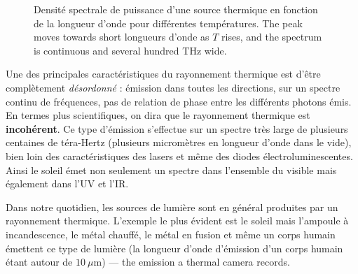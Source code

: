\begin{figure}[h!]
  \caption*{\footnotesize Densité spectrale de puissance d'une source thermique
  en fonction de la longueur d'onde pour différentes températures. The peak
  moves towards short longueurs d'onde as $T$ rises, and the spectrum is
  continuous and several hundred THz wide.}
\end{figure}

Une des principales caractéristiques du rayonnement thermique est d'être
complètement \emph{désordonné} : émission dans toutes les directions, sur un
spectre continu de fréquences, pas de relation de phase entre les différents
photons émis. En termes plus scientifiques, on dira que le rayonnement
thermique est \textbf{incohérent}. Ce type d'émission s'effectue sur un spectre
très large de plusieurs centaines de téra-Hertz (plusieurs micromètres en
longueur d'onde dans le vide), bien loin des caractéristiques des lasers et même
des diodes électroluminescentes. Ainsi le soleil émet non seulement un spectre
dans l'ensemble du visible mais également dans l'UV et l'IR.

\begin{example}
  Dans notre quotidien, les sources de lumière sont en général produites par un
  rayonnement thermique. L'exemple le plus évident est le soleil mais l'ampoule
  à incandescence, le métal chauffé, le métal en fusion et même un corps humain
  émettent ce type de lumière (la longueur d'onde d'émission d'un corps humain
  étant autour de $10\ \mu$m) --- the emission a thermal camera records.
\end{example}


